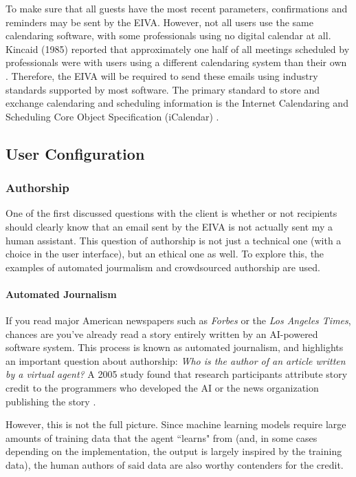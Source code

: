 \documentclass{article}
\begin{document}
To make sure that all guests have the most recent parameters, confirmations and reminders may be sent by the EIVA. However, not all users use the same calendaring software, with some professionals using no digital calendar at all. Kincaid (1985) reported that approximately one half of all meetings scheduled by professionals were with users using a different calendaring system than their own \cite{kincaid_electronic_1985}. Therefore, the EIVA will be required to send these emails using industry standards supported by most software. The primary standard to store and exchange calendaring and scheduling information is the Internet Calendaring and Scheduling Core Object Specification (iCalendar) \cite{desruisseaux_internet_2009}.

\subsection{User Configuration}

\subsubsection{Authorship}

One of the first discussed questions with the client is whether or not recipients should clearly know that an email sent by the EIVA is not actually sent my a human assistant. This question of authorship is not just a technical one (with a choice in the user interface), but an ethical one as well. To explore this, the examples of automated jourmalism and crowdsourced authorship are used.

\paragraph{Automated Journalism}

If you read major American newspapers such as \emph{Forbes} or the \emph{Los Angeles Times}, chances are you've already read a story entirely written by an AI-powered software system. This process is known as automated journalism, and highlights an important question about authorship: \emph{Who is the author of an article written by a virtual agent?} A 2005 study found that research participants attribute story credit to the programmers who developed the AI or the news organization publishing the story \cite{montal_i_2017}.

However, this is not the full picture. Since machine learning models require large amounts of training data that the agent ``learns" from (and, in some cases depending on the implementation, the output is largely inspired by the training data), the human authors of said data are also worthy contenders for the credit.
\end{document}
